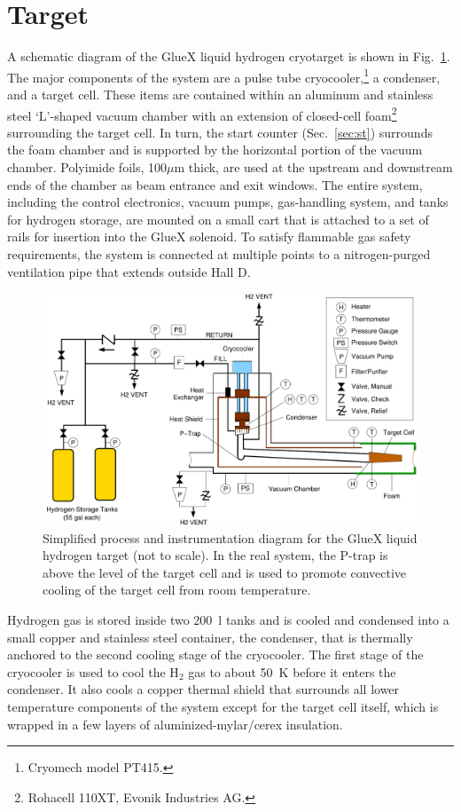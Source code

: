 \section[Target]{Target \label{sec:target} }
A schematic diagram of the GlueX liquid hydrogen cryotarget is shown in Fig.~\ref{fig:Target}. The major components of the system are a pulse tube cryocooler,\footnote{Cryomech model PT415.} a condenser, and a target cell.  These items are contained within an aluminum and stainless steel `L'-shaped vacuum chamber with an extension of closed-cell foam\footnote{Rohacell 110XT, Evonik Industries AG.} surrounding the target cell. In turn, the \gx{} start counter (Sec.~\ref{sec:st}) surrounds the foam chamber and is supported by the horizontal portion of the vacuum chamber. Polyimide foils, 100$\mu$m thick, are used at the upstream and downstream ends of the chamber as beam entrance and exit windows. The entire system, including the control electronics, vacuum pumps, gas-handling system, and tanks for hydrogen storage, are mounted on a small cart that is attached to a set of rails for insertion into the GlueX solenoid.  To satisfy flammable gas safety requirements, the system is connected at multiple points to a nitrogen-purged ventilation pipe that extends outside Hall D.
\begin{figure}
\begin{center}
\includegraphics[width=4.5in]{figures/TargetSchematic3.pdf}
\end{center}
\caption{Simplified process and instrumentation diagram for the GlueX liquid hydrogen target (not to scale).
In the real system, the P-trap is above the level of the target cell and is used to
promote convective cooling of the target cell from room temperature.}
\label{fig:Target}
\end{figure}

Hydrogen gas is stored inside two 200~l tanks and
is cooled and condensed into a small copper and stainless steel container,
the condenser, that is thermally anchored to the second cooling stage of the cryocooler. 
The first stage of the cryocooler is used to
cool the H$_2$ gas to about 50~K before it enters the condenser.
It also cools a copper thermal shield that surrounds all
lower temperature components of the system except for the
target cell itself, which is wrapped in a few layers of aluminized-mylar/cerex insulation.

